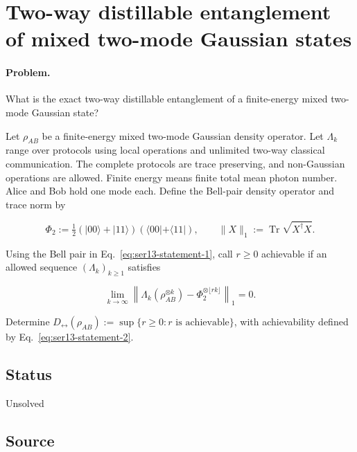 \section{Two-way distillable entanglement of mixed two-mode Gaussian states}
\label{sec:op_68d6ff4ef7be1577}

\paragraph{Problem.}
What is the exact two-way distillable entanglement of a finite-energy mixed two-mode Gaussian state?

Let $\rho_{AB}$ be a finite-energy mixed two-mode Gaussian density operator. Let $\Lambda_k$ range over protocols using local operations and unlimited two-way classical communication. The complete protocols are trace preserving, and non-Gaussian operations are allowed. Finite energy means finite total mean photon number. Alice and Bob hold one mode each. Define the Bell-pair density operator and trace norm by

\begin{equation}
\Phi_2:=\tfrac12(|00\rangle+|11\rangle)(\langle00|+\langle11|),
\qquad
\lVert X\rVert_1:=\operatorname{Tr}\sqrt{X^\dagger X}.
\label{eq:ser13-statement-1}
\end{equation}

Using the Bell pair in Eq.~\eqref{eq:ser13-statement-1}, call $r\geq0$ achievable if an allowed sequence $(\Lambda_k)_{k\geq1}$ satisfies

\begin{equation}
\lim_{k\to\infty}\left\lVert\Lambda_k(\rho_{AB}^{\otimes k})-\Phi_2^{\otimes\lfloor rk\rfloor}\right\rVert_1=0.
\label{eq:ser13-statement-2}
\end{equation}

Determine $D_{\leftrightarrow}(\rho_{AB}):=\sup\{r\geq0:r\text{ is achievable}\}$, with achievability defined by Eq.~\eqref{eq:ser13-statement-2}.

\subsection*{Status}

Unsolved

\subsection*{Source}

